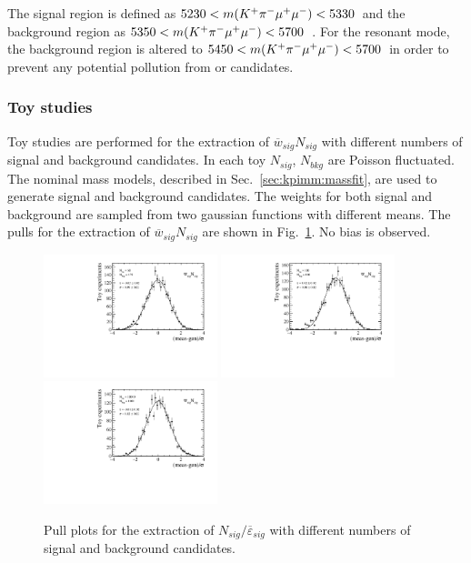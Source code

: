 The signal region is defined as $5230<m({{K}^+}{{\pi}^-}{\mu^+}{\mu^-})<5330$~\mevcc and the background region as $5350<m({{K}^+}{{\pi}^-}{\mu^+}{\mu^-})<5700$~\mevcc. For the resonant mode, the background region is altered to $5450<m({{K}^+}{{\pi}^-}{\mu^+}{\mu^-})<5700$~\mevcc in order to prevent any potential pollution from \BdToJPsiKst or \BsToJPsiKst candidates.

\subsubsection{Toy studies}

Toy studies are performed for the extraction of $\overline{w}_{sig}N_{sig}$ with different numbers of signal and background candidates.  In each toy $N_{sig}$, $N_{bkg}$ are Poisson fluctuated.  The nominal mass models, described in Sec.~\ref{sec:kpimm:massfit}, are used to generate signal and background candidates. The weights for both signal and background are sampled from two gaussian functions with different means.  The pulls for the extraction of $\overline{w}_{sig}N_{sig}$ are shown in Fig.~\ref{fig:bf:pulls}. No bias is observed.
 
\begin{figure}[!tb]
 \centering
 \includegraphics[width=0.45\textwidth]{figs/kpimm/bf/n_prime_low_yield.pdf}
 \includegraphics[width=0.45\textwidth]{figs/kpimm/bf/n_prime_med_yield.pdf}
 \includegraphics[width=0.45\textwidth]{figs/kpimm/bf/n_prime_high_yield.pdf}
 \caption{Pull plots for the extraction of $N_{sig}/\overline{\varepsilon}_{sig}$ with different numbers of signal and background candidates.}
 \label{fig:bf:pulls}
\end{figure}

